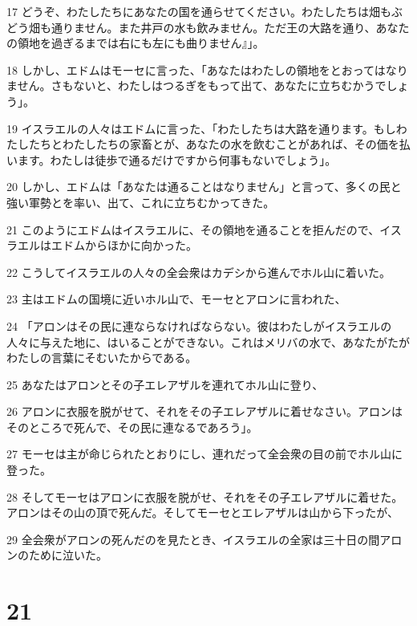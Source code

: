 \par 17 どうぞ、わたしたちにあなたの国を通らせてください。わたしたちは畑もぶどう畑も通りません。また井戸の水も飲みません。ただ王の大路を通り、あなたの領地を過ぎるまでは右にも左にも曲りません』」。
\par 18 しかし、エドムはモーセに言った、「あなたはわたしの領地をとおってはなりません。さもないと、わたしはつるぎをもって出て、あなたに立ちむかうでしょう」。
\par 19 イスラエルの人々はエドムに言った、「わたしたちは大路を通ります。もしわたしたちとわたしたちの家畜とが、あなたの水を飲むことがあれば、その価を払います。わたしは徒歩で通るだけですから何事もないでしょう」。
\par 20 しかし、エドムは「あなたは通ることはなりません」と言って、多くの民と強い軍勢とを率い、出て、これに立ちむかってきた。
\par 21 このようにエドムはイスラエルに、その領地を通ることを拒んだので、イスラエルはエドムからほかに向かった。
\par 22 こうしてイスラエルの人々の全会衆はカデシから進んでホル山に着いた。
\par 23 主はエドムの国境に近いホル山で、モーセとアロンに言われた、
\par 24 「アロンはその民に連ならなければならない。彼はわたしがイスラエルの人々に与えた地に、はいることができない。これはメリバの水で、あなたがたがわたしの言葉にそむいたからである。
\par 25 あなたはアロンとその子エレアザルを連れてホル山に登り、
\par 26 アロンに衣服を脱がせて、それをその子エレアザルに着せなさい。アロンはそのところで死んで、その民に連なるであろう」。
\par 27 モーセは主が命じられたとおりにし、連れだって全会衆の目の前でホル山に登った。
\par 28 そしてモーセはアロンに衣服を脱がせ、それをその子エレアザルに着せた。アロンはその山の頂で死んだ。そしてモーセとエレアザルは山から下ったが、
\par 29 全会衆がアロンの死んだのを見たとき、イスラエルの全家は三十日の間アロンのために泣いた。

\chapter{21}

